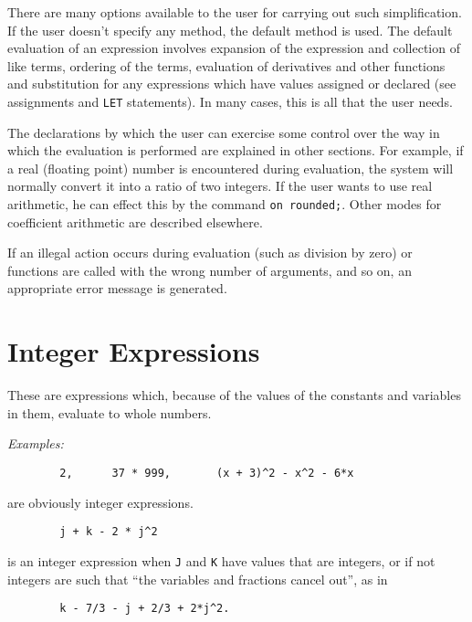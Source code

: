 There are many options available to the user for carrying out such
simplification.  If the user doesn't specify any
method, the default method is used.  The default evaluation of an
expression involves expansion of the expression and collection of like
terms, ordering of the terms, evaluation of derivatives and other
functions and substitution for any expressions which have values assigned
or declared (see assignments and {\tt LET} statements).  In many cases,
this is all that the user needs.

The declarations by which the user can exercise some control over the way
in which the evaluation is performed are explained in other sections.  For
example, if a real (floating point) number is encountered during
evaluation, the system will normally convert it into a ratio of two
integers.  If the user wants to use real arithmetic, he can effect this by
the command {\tt on rounded;}. Other modes for
coefficient arithmetic are described elsewhere.

If an illegal action occurs during evaluation (such as division by zero)
or functions are called with the wrong number of arguments, and so on, an
appropriate error message is generated.

\section{Integer Expressions}

These are expressions which, because of the values of the
constants and variables in them, evaluate to whole numbers.

{\it Examples:}
\begin{verbatim}
        2,      37 * 999,       (x + 3)^2 - x^2 - 6*x
\end{verbatim}
are obviously integer expressions.
\begin{verbatim}
        j + k - 2 * j^2
\end{verbatim}
is an integer expression when {\tt J} and {\tt K} have values that are
integers, or if not integers are such that ``the variables and fractions
cancel out'', as in
\begin{verbatim}
        k - 7/3 - j + 2/3 + 2*j^2.
\end{verbatim}

